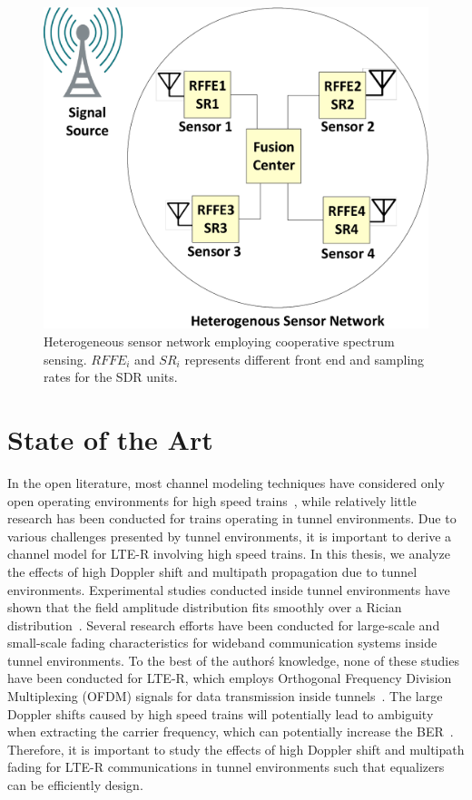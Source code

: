 \begin{figure}[!ht]
\centering
\includegraphics[width=\textwidth,keepaspectratio]{images/Gill/figs/introdiag.eps} 
\caption{Heterogeneous sensor network employing cooperative spectrum sensing. $RFFE_i$ and $SR_i$ represents different front end and sampling rates for the SDR units.}
\label{fig:css}
\end{figure}

\section{State of the Art}

In the open literature, most channel modeling techniques have considered only open operating environments for high speed trains~\cite{inplter5,inplter6}, while relatively little research has been conducted for trains operating in tunnel environments. Due to various challenges presented by tunnel environments, it is important to derive a channel model for LTE-R involving high speed trains. In this thesis, we analyze the effects of high Doppler shift and multipath propagation due to tunnel environments. Experimental studies conducted inside tunnel environments have shown that the field amplitude distribution fits smoothly over a Rician distribution~\cite{inplter8}. Several research efforts have been conducted for large-scale and small-scale fading characteristics for wideband communication systems inside tunnel environments. To the best of the author\'s knowledge, none of these studies have been conducted for LTE-R, which employs Orthogonal Frequency Division Multiplexing (OFDM) signals for data transmission inside tunnels~\cite{7553613}. The large Doppler shifts caused by high speed trains will potentially lead to ambiguity when extracting the carrier frequency, which can potentially increase the BER~\cite{inplter9}. Therefore, it is important to study the effects of high Doppler shift and multipath fading for LTE-R communications in tunnel environments such that equalizers can be efficiently design.

